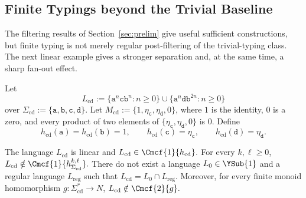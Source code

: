 
\subsection{Finite Typings beyond the Trivial Baseline}
\label{subsec:finite-typing-separations}


The filtering results of Section~\ref{sec:prelim} give useful sufficient
constructions, but finite typing is not merely regular post-filtering of the
trivial-typing class.  The next linear example gives a stronger separation and,
at the same time, a sharp fan-out effect.

Let
\[
  L_{\mathrm{cd}}:=
  \{\mathtt a^n\mathtt c\mathtt b^n:n\ge0\}
  \cup
  \{\mathtt a^n\mathtt d\mathtt b^{2n}:n\ge0\}
\]
over $\Sigma_{\mathrm{cd}}:=\{\mathtt a,\mathtt b,\mathtt c,\mathtt d\}$.  Let
$M_{\mathrm{cd}}:=\{1,\eta_{\mathtt c},\eta_{\mathtt d},0\}$, where $1$ is the identity, $0$ is a zero,
and every product of two elements of $\{\eta_{\mathtt c},\eta_{\mathtt d},0\}$ is $0$.  Define
\[
 h_{\mathrm{cd}}(\mathtt a)=h_{\mathrm{cd}}(\mathtt b)=1,
 \qquad
 h_{\mathrm{cd}}(\mathtt c)=\eta_{\mathtt c},
 \qquad
 h_{\mathrm{cd}}(\mathtt d)=\eta_{\mathtt d}.
\]

\begin{proposition}
\label{prop:strong-fanout-separation}
The language $L_{\mathrm{cd}}$ is linear and
\(L_{\mathrm{cd}}\in\Cmcf{1}{h_{\mathrm{cd}}}.\)
For every $k,\ell\ge0$,
\(L_{\mathrm{cd}}\notin\Cmcf{1}{h_{\Sigma_{\mathrm{cd}}}^{k,\ell}}.\)
There do not exist a language $L_0\in \YSub{1}$ and a regular language
$L_{\mathrm{reg}}$ such that
$L_{\mathrm{cd}}=L_0\cap L_{\mathrm{reg}}$.  Moreover, for every finite monoid
homomorphism $g:\Sigma_{\mathrm{cd}}^*\to N$,
\(L_{\mathrm{cd}}\notin\Cmcf{2}{g}.\)
\end{proposition}

